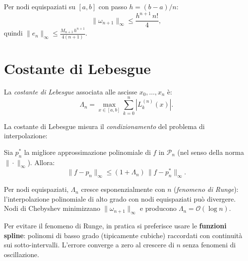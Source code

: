 \begin{example}
Per nodi equispaziati su $[a,b]$ con passo $h = (b-a)/n$:
\[
  \|\omega_{n+1}\|_\infty \leq \frac{h^{n+1}\, n!}{4},
\]
quindi $\|e_n\|_\infty \leq \frac{M_{n+1}\,h^{n+1}}{4(n+1)}$.
\end{example}

\section{Costante di Lebesgue}
\label{sec:lebesgue}

\begin{definition}
La \emph{costante di Lebesgue} associata alle ascisse $x_0,\ldots,x_n$ è:
\begin{equation}
  \Lambda_n = \max_{x \in [a,b]} \sum_{k=0}^n |L_k^{(n)}(x)|.
  \label{eq:lebesgue}
\end{equation}
\end{definition}

La costante di Lebesgue misura il \emph{condizionamento} del problema di
interpolazione:

\begin{theorem}
Sia $p^*_n$ la migliore approssimazione polinomiale di $f$ in $\mathcal{P}_n$
(nel senso della norma $\|\cdot\|_\infty$). Allora:
\begin{equation}
  \|f - p_n\|_\infty \leq (1 + \Lambda_n)\,\|f - p^*_n\|_\infty.
  \label{eq:lebesgue_bound}
\end{equation}
\end{theorem}

\begin{remark}
Per nodi equispaziati, $\Lambda_n$ cresce esponenzialmente con $n$
(\emph{fenomeno di Runge}): l'interpolazione polinomiale di alto grado con nodi
equispaziati può divergere. Nodi di Chebyshev minimizzano $\|\omega_{n+1}\|_\infty$
e producono $\Lambda_n = \mathcal{O}(\log n)$.
\end{remark}

\begin{remark}[Spline]
Per evitare il fenomeno di Runge, in pratica si preferisce usare le
\textbf{funzioni spline}: polinomi di basso grado (tipicamente cubiche) raccordati
con continuità sui sotto-intervalli. L'errore converge a zero al crescere di $n$
senza fenomeni di oscillazione.
\end{remark}
